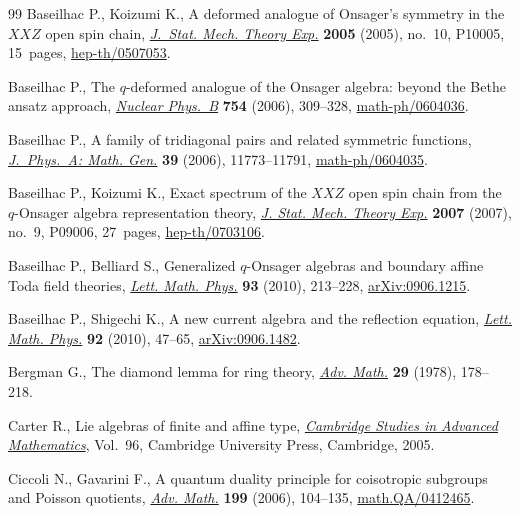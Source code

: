 \documentclass[pdftex]{sigma}
\numberwithin{equation}{section}
\begin{document}
\begin{thebibliography}{99}
Baseilhac P.,  Koizumi K.,
A deformed analogue of Onsager's symmetry  in the  $XXZ$ open spin chain,
\href{http://dx.doi.org/10.1088/1742-5468/2005/10/P10005}{{\it J.~Stat. Mech. Theory Exp.}}  {\bf 2005} (2005),  no.~10, P10005, 15~pages,
\href{http://arxiv.org/abs/hep-th/0507053}{hep-th/0507053}.

 Baseilhac P.,
  The $q$-deformed analogue of the Onsager algebra: beyond the Bethe ansatz approach,
\href{http://dx.doi.org/10.1016/j.nuclphysb.2006.08.008}{{\it Nuclear Phys.~B}} {\bf  754} (2006), 309--328,
\href{http://arxiv.org/abs/math-ph/0604036}{math-ph/0604036}.


Baseilhac P.,
A family of tridiagonal pairs and related symmetric functions,
\href{http://dx.doi.org/10.1088/0305-4470/39/38/005}{{\it J.~Phys.~A: Math. Gen.}} {\bf 39} (2006), 11773--11791,
\href{http://arxiv.org/abs/math-ph/0604035}{math-ph/0604035}.

Baseilhac P., Koizumi K.,
 Exact spectrum of the $XXZ$ open spin chain from the $q$-Onsager algebra representation theory,
\href{http://dx.doi.org/10.1088/1742-5468/2007/09/P09006}{{\it  J. Stat. Mech. Theory Exp.}} {\bf 2007} (2007),  no.~9, P09006, 27~pages,
\href{http://arxiv.org/abs/hep-th/0703106}{hep-th/0703106}.


Baseilhac P., Belliard S.,
Generalized $q$-Onsager algebras and boundary af\/f\/ine Toda f\/ield theories,
\href{http://dx.doi.org/10.1007/s11005-010-0412-6}{{\it Lett. Math. Phys.}} {\bf 93}  (2010),  213--228,
\href{http://arxiv.org/abs/0906.1215}{arXiv:0906.1215}.


Baseilhac P., Shigechi K.,
A new current algebra and the ref\/lection equation,
\href{http://dx.doi.org/10.1007/s11005-010-0380-x}{{\it Lett. Math. Phys.}}  {\bf 92} (2010),   47--65,
\href{http://arxiv.org/abs/0906.1482}{arXiv:0906.1482}.

Bergman G.,
The diamond  lemma for ring theory,
\href{http://dx.doi.org/10.1016/0001-8708(78)90010-5}{{\it Adv. Math.}} {\bf 29} (1978), 178--218.


Carter R.,
Lie algebras of f\/inite and af\/f\/ine type,
\href{http://dx.doi.org/10.1017/CBO9780511614910}{{\it Cambridge Studies in Advanced Mathematics}}, Vol.~96,
Cambridge University Press, Cambridge, 2005.



Ciccoli N.,  Gavarini F.,
 A quantum duality principle for coisotropic subgroups and Poisson quotients,
\href{http://dx.doi.org/10.1016/j.aim.2005.01.009}{{\it Adv. Math.}}  {\bf 199} (2006),  104--135,
\href{http://arxiv.org/abs/math.QA/0412465}{math.QA/0412465}.


\end{thebibliography}
\end{document}
